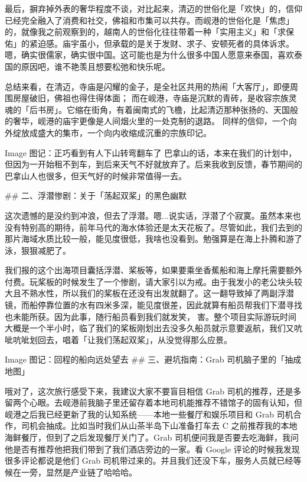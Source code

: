 最后，摒弃掉外表的奢华程度不谈，对比起来，清迈的世俗化是「欢快」的，信仰已经完全融入了消费和社交，佛祖和市集可以共存。而岘港的世俗化是「焦虑」的，就像我之前观察到的，越南人的世俗化往往带着一种「实用主义」和「求保佑」的紧迫感。庙宇虽小，但承载的是关于发财、求子、安顿死者的具体诉求。嗯，确实很儒家，确实很中国。这可能也是为什么很多中国人愿意来泰国，喜欢泰国的原因吧，谁不艳羡且想要松弛和快乐呢。

总结来看，在清迈，寺庙是闪耀的金子，是全社区共用的热闹「大客厅」，即便周围房屋破旧，佛祖也得住得体面； 而在岘港，寺庙是沉默的青砖，是收容宗族灵魂的「后书房」。它缩在街角，有着闽南式的飞檐，比起清迈那种张扬的、天国般的奢华，岘港的庙宇更像是人间烟火里的一处克制的退路。 同样的信仰，一个向外绽放成盛大的集市，一个向内收缩成沉重的宗族印记。

Image
图记：正巧看到有人下山转弯翻车了
巴拿山的话，本来在我们的计划中，但因为一开始租不到车，到后来天气不好就放弃了。后来我收到反馈，春节期间的巴拿山人也很多，但天气好的时候非常值得一去。

## 二、浮潜惨剧：关于「荡起双桨」的黑色幽默

这次遗憾的是没约到冲浪，但去了浮潜。嗯...说实话，浮潜了个寂寞。虽然本来也没有特别高的期待，前年马代的海水体验还是太天花板了。尽管如此，我们去到的那片海域水质比较一般，能见度很低，我啥也没看到。勉强算是在海上扑腾和游了泳，狠狠减肥了。

我们报的这个出海项目囊括浮潜、桨板等，如果要乘坐香蕉船和海上摩托需要额外付费。玩桨板的时候发生了一个惨剧，请大家引以为戒。由于我发小的老公块头较大且不熟水性，所以我们的桨板在还没有出发就翻了。这一翻导致掉了两副浮潜镜，而船停靠位置的水有四米多深，能见度很差，因此就算有船员帮我们下潜寻找也未能所获。因为此事，随行船员看到我们就发笑，🤷害。整个项目实际游玩时间大概是一个半小时，临了我们的桨板刚划出去没多久船员就示意要返航，我们又吭呲吭呲划回去，唱着「让我们荡起双桨」，从没觉得那么应景。

Image
图记：回程的船向远处望去
## 三、避坑指南：Grab 司机脑子里的「抽成地图」

哦对了，这次旅行感受下来，我建议大家不要盲目相信 Grab 司机的推荐，还是多留两个心眼。去岘港前我脑子里还留存着本地司机能推荐不错馆子的固有认知，但岘港之后我已经更新了我的认知系统——本地一些餐厅和娱乐项目和 Grab 司机合作，司机会抽成。比如当时我们从山茶半岛下山准备打车去 C 之前推荐我的本地海鲜餐厅，但到了之后发现餐厅关门了。Grab 司机便问我是否要去吃海鲜，我问他是否有推荐他把我们带到了我们酒店旁边的一家。看 Google 评论的时候我发现很多评论都说是他们 Grab 司机带过来的。并且我们还没下车，服务人员就已经等候在一旁，显然是产业链了哈哈哈。

